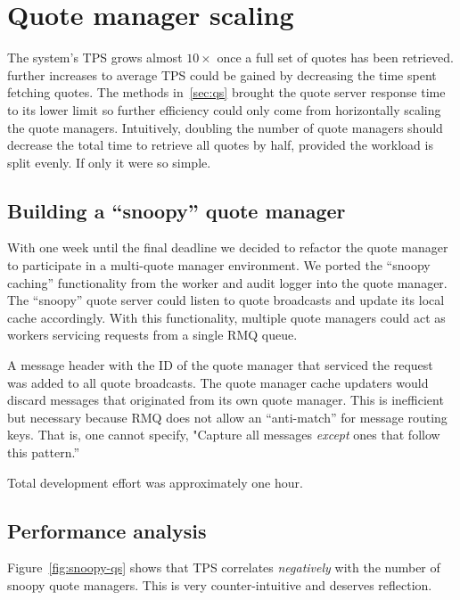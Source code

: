 \section{Quote manager scaling}
The system's TPS grows almost $10\times$ once a full set of quotes has been retrieved. further increases to average TPS could be gained by decreasing the time spent fetching quotes.
The methods in~\ref{sec:qs} brought the quote server response time to its lower limit so further efficiency could only come from horizontally scaling the quote managers.
Intuitively, doubling the number of quote managers should decrease the total time to retrieve all quotes by half, provided the workload is split evenly.
If only it were so simple.

\subsection{Building a ``snoopy'' quote manager}
With one week until the final deadline we decided to refactor the quote manager to participate in a multi-quote manager environment.
We ported the ``snoopy caching'' functionality from the worker and audit logger into the quote manager.
The ``snoopy'' quote server could listen to quote broadcasts and update its local cache accordingly.
With this functionality, multiple quote managers could act as workers servicing requests from a single RMQ queue. 

A message header with the ID of the quote manager that serviced the request was added to all quote broadcasts.
The quote manager cache updaters would discard messages that originated from its own quote manager.
This is inefficient but necessary because RMQ does not allow an ``anti-match'' for message routing keys.
That is, one cannot specify, "Capture all messages \textit{except} ones that follow this pattern.''

Total development effort was approximately one hour.

\subsection{Performance analysis}
Figure~\ref{fig:snoopy-qs} shows that TPS correlates \textit{negatively} with the number of snoopy quote managers.
This is very counter-intuitive and deserves reflection.

